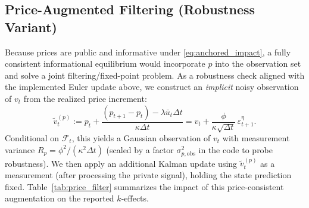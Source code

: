 \subsection{Price-Augmented Filtering (Robustness Variant)}
 
 Because prices are public and informative under \eqref{eq:anchored_impact}, a fully consistent informational equilibrium would incorporate $p$ into the observation set and solve a joint filtering/fixed-point problem. As a robustness check aligned with the implemented Euler update above, we construct an \emph{implicit} noisy observation of $v_t$ from the realized price increment:
 \[
 \tilde v^{(p)}_t
 := p_t+\frac{(p_{t+1}-p_t)-\lambda \bar u_t\Delta t}{\kappa\Delta t}
  = v_t+\frac{\phi}{\kappa\sqrt{\Delta t}}\,\varepsilon^\eta_{t+1}.
  \]
 Conditional on $\mathcal F_t$, this yields a Gaussian observation of $v_t$ with measurement variance
 $R_p=\phi^2/(\kappa^2\Delta t)$ (scaled by a factor $\sigma_{p,\mathrm{obs}}^2$ in the code to probe robustness). We then apply an additional Kalman update using $\tilde v^{(p)}_t$ as a measurement (after processing the private signal), holding the state prediction fixed. Table~\ref{tab:price_filter} summarizes the impact of this price-consistent augmentation on the reported $k$-effects.
